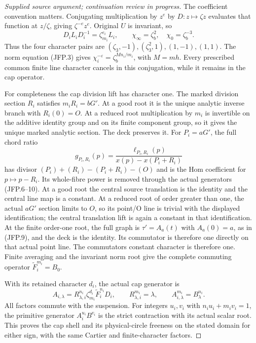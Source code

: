 \begin{proof}[Supplied source argument; continuation review in progress]
The coefficient convention matters. Conjugating multiplication
by \(z^e\) by \(D:z\mapsto\zeta z\) evaluates that function
at \(z/\zeta\), giving \(\zeta^{-e}z^e\). Original \(U\)
is invariant, so
\[
 D_iL_iD_i^{-1}=\zeta_{m_i}^{e_i}L_i,\qquad
 \chi_\infty=\zeta_b^2,\quad\chi_0=\zeta_b^{-3}.
\tag{JFP.18}
\]
Thus the four character pairs are
\((\zeta_3,-1),(\zeta_3^2,1),(1,-1),(1,1)\).
The norm equation (JFP.3) gives
\(\chi_i^{-\varepsilon}=\zeta_b^{Mn_i/m_i}\),
with \(M=mh\). Every prescribed common finite line character
cancels in this conjugation, while it remains in the cap operator.

For completeness the cap division lift has character one.
The marked division section \(R_i\) satisfies \(m_iR_i=bG'\).
At a good root it is the unique analytic inverse branch with
\(R_i(0)=O\). At a reduced root multiplication by \(m_i\)
is invertible on the additive identity group and on its finite
component group, so it gives the unique marked analytic section.
The deck preserves it. For \(P_i=aG'\), the full chord ratio
\[
 g_{P_i,R_i}(p)=
 \frac{\ell_{P_i,R_i}(p)}{x(p)-x(P_i+R_i)}
\tag{JFP.19}
\]
has divisor \((P_i)+(R_i)-(P_i+R_i)-(O)\) and is the Hom
coefficient for \(p\mapsto p-R_i\). Its whole-fibre power is
removed through the actual generators (JFP.6--10). At a good root
the central source translation is the identity and the central
line map is a constant. At a reduced root of order greater than one, the actual \(aG'\)
section limits to \(O\), so its point/O line is trivial with
the displayed identification; the central translation lift is
again a constant in that identification. At the finite order-one
root, the full graph is \(\tau'=A_a(t)\) with
\(A_a(0)=a\), as in (JFP.9), and the deck is the identity.
Its commutator is therefore one directly on that actual point line.
The commutator\textquotesingle s
constant character is therefore one. Finite averaging and the
invariant norm root give the complete commuting operator
\(\widetilde F_i^{m_i}=B_0\).

With its retained character \(d_i\), the actual cap generator is
\[
 A_{i,\lambda}=R_{\lambda,i}^{n_i}\zeta_{m_i}^{d_i}
 \widetilde F_i^{n_i}D_i,\qquad
 R_{\lambda,i}^{m_i}=\lambda,\qquad
 A_{i,\lambda}^{m_i}=B_\lambda^{n_i}.
\tag{JFP.20}
\]
All factors commute with the suspension. For integers \(u_i,v_i\)
with \(n_iu_i+m_iv_i=1\), the primitive generator
\(A_i^{u_i}B^{v_i}\) is the strict contraction with its actual
scalar root. This proves the cap shell and its physical-circle
freeness on the stated domain for either sign, with the same
Cartier and finite-character factors.


\end{proof}
